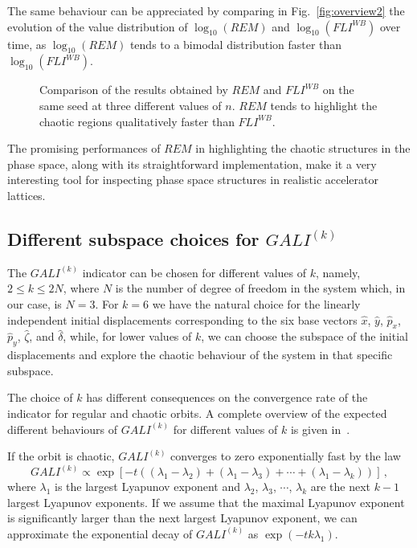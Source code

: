 The same behaviour can be appreciated by comparing in Fig.~\ref{fig:overview2} the evolution of the value distribution of $\log_{10}(REM)$ and $\log_{10}(FLI^{WB})$ over time, as $\log_{10}(REM)$ tends to a bimodal distribution faster than $\log_{10}(FLI^{WB})$.

\begin{figure}
    \centering
    \caption{Comparison of the results obtained by $REM$ and $FLI^{WB}$ on the same seed at three different values of $n$. $REM$ tends to highlight the chaotic regions qualitatively faster than $FLI^{WB}$.}
    \label{fig:rem_lhc}
\end{figure}

The promising performances of $REM$ in highlighting the chaotic structures in the phase space, along with its straightforward implementation, make it a very interesting tool for inspecting phase space structures in realistic accelerator lattices.

\subsection{Different subspace choices for $GALI^{(k)}$}

The $GALI^{(k)}$ indicator can be chosen for different values of $k$, namely, $2 \leq k \leq 2N$, where $N$ is the number of degree of freedom in the system which, in our case, is $N=3$. For $k=6$ we have the natural choice for the linearly independent initial displacements corresponding to the six base vectors $\hat{x}$, $\hat{y}$, $\hat{p}_x$, $\hat{p}_y$, $\hat{\zeta}$, and $\hat{\delta}$, while, for lower values of $k$, we can choose the subspace of the initial displacements and explore the chaotic behaviour of the system in that specific subspace.

The choice of $k$ has different consequences on the convergence rate of the indicator for regular and chaotic orbits. A complete overview of the expected different behaviours of $GALI^{(k)}$ for different values of $k$ is given in~\cite{SKOKOS200730}.

If the orbit is chaotic, $GALI^{(k)}$ converges to zero exponentially fast by the law
\begin{equation}
    GALI^{(k)} \propto \exp\left[-t\left((\lambda_1 - \lambda_2)+(\lambda_1 - \lambda_3)+\cdots+(\lambda_1 - \lambda_k)\right)\right] \,,
\end{equation}
where $\lambda_1$ is the largest Lyapunov exponent and $\lambda_2$, $\lambda_3$, $\cdots$, $\lambda_k$ are the next $k-1$ largest Lyapunov exponents. If we assume that the maximal Lyapunov exponent is significantly larger than the next largest Lyapunov exponent, we can approximate the exponential decay of $GALI^{(k)}$ as $\exp(-tk\lambda_1)$.

